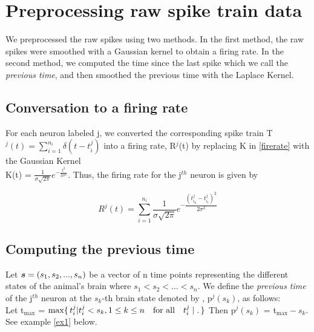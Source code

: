 \section{Preprocessing raw spike train data}
We preprocessed the raw spikes using two methods.
In the first method, the raw spikes were smoothed with a Gaussian kernel to obtain a firing rate. In the second method, we computed the time since the last spike which we call the \textit{previous time}, and then smoothed the previous time with the Laplace Kernel.\\


\subsection{Conversation to a firing rate}
For each neuron labeled j,  we converted the corresponding spike train 
T$^{j}(t) = \displaystyle \sum_{i=1}^{n_{i}} \delta(t-t_{i}^{j}) $ into a firing rate,
 R$^{j}$(t) by replacing K in \eqref{firerate} with the  Gaussian Kernel\\
 K(t) =  $\displaystyle \frac{1}{\sigma \sqrt{2\pi}} e^{-\frac{t^2}{2\sigma^2}} $.
Thus, the firing rate for the j$^{th}$ neuron is given by

\begin{equation} \label{jfirerate}
R^{j}(t) = \sum_{i=1}^{n_{i}}  \frac{1}{\sigma \sqrt{2\pi}} 
e^{-\dfrac{(t_{i_{k}}^{j}  - t_{i_{l}}^{j})^2}{2\sigma^2}} 
\end{equation}

\subsection{Computing the previous time}
Let $\boldsymbol{s} = (s_1, s_2, ..., s_n)$  be a vector of n time points representing the different states of the animal's brain  where  $s_1 < s_2 < ... < s_n$. We  define the \textit{previous time} of the j$^{th}$ neuron at the $s_{k}$-th brain state  denoted by , p$^{j}(s_{k})$, as follows:\\
Let t$_{\max}$ = $\max  \{\, t^{j}_{i} | t^{j}_{i} < s_{k},
1 \leq k \leq n \quad \text{for all} \quad  t^{j}_{i} \mid.\,\}$ Then p$^{j}(s_{k})$ = t$_{\max} - s_{k}.$\\
See example  \eqref{ex1} below.




